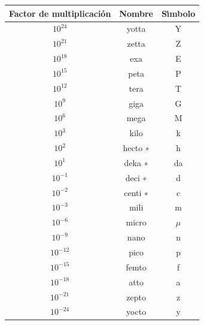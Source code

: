 \begin{tabular}{|c|c|c|}
\hline 
Factor de multiplicación & Nombre  & Sı́mbolo  \\
\hline 
$10^{24}$                    & yotta   & Y       \\
$10 ^{21}$                    & zetta   & Z       \\
$10 ^{18}$                    & exa     & E       \\
$10 ^{15}$                    & peta    & P       \\
$10 ^{12}$                    & tera    & T       \\
$10 ^{9}$                     & giga    & G       \\
$10 ^{6}$                     & mega    & M       \\
$10 ^{3}$                     & kilo    & k       \\
$10 ^{2}$                     & hecto ∗ & h       \\
$10 ^{1}$                     & deka ∗  & da      \\
$10 ^{-1}$                    & deci ∗  & d       \\
$10 ^{-2}$                    & centi ∗ & c       \\
$10 ^{-3}$                    & mili    & m       \\
$10 ^{-6}$                    & micro   & $\mu $       \\
$10 ^{-9}$                    & nano    & n       \\
$10 ^{-12}$                   & pico    & p       \\
$10 ^{-15}$                   & femto   & f       \\
$10 ^{-18}$                   & atto    & a       \\
$10 ^{-21}$                   & zepto   & z       \\
$10 ^{-24}$                   & yocto   & y \\ \hline 
\end{tabular}


